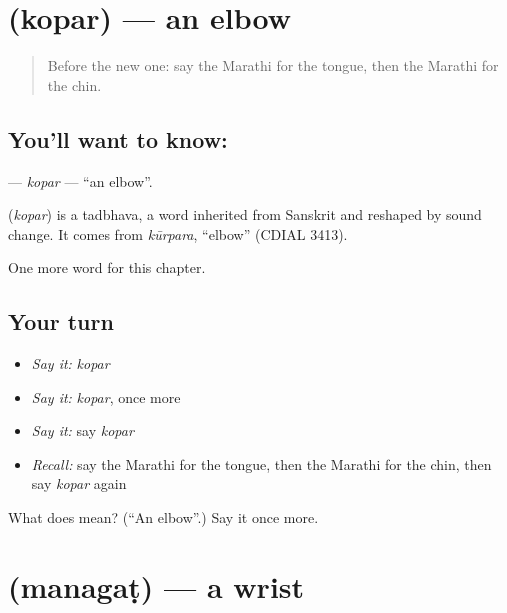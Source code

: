 \section[\texorpdfstring{\mr{कोपर} (kopar)}{कोपर (kopar)}]{ (kopar) — an elbow}

\label{lesson:MR-C145-kopar}



\begin{quote}
Before the new one: say the Marathi for the tongue, then the Marathi for the chin.
\end{quote}

\subsection*{You'll want to know: }
\textbf{} — \emph{kopar} — \textquotedblleft{}an elbow\textquotedblright{}.

\begin{cousinweb}
\textbf{} (\emph{kopar}) is a tadbhava, a word inherited from Sanskrit and reshaped by sound change. It comes from \emph{kūrpara}, \textquotedblleft{}elbow\textquotedblright{} (CDIAL 3413).
\end{cousinweb}

\begin{grammarlens}[title={What you've built}]
One more word for this chapter.
\end{grammarlens}

\subsection*{Your turn}
\begin{itemize}
\raggedright
  \item \emph{Say it:} \emph{kopar}
  \item \emph{Say it:} \emph{kopar}, once more
  \item \emph{Say it:} say \emph{kopar}
  \item \emph{Recall:} say the Marathi for the tongue, then the Marathi for the chin, then say \emph{kopar} again
\end{itemize}

\begin{tcolorbox}[breakable,colback=teal!4,colframe=teal!35!black,title={Before you move on}]
What does  mean? (\textquotedblleft{}An elbow\textquotedblright{}.) Say it once more.
\end{tcolorbox}
\section[\texorpdfstring{\mr{मनगट} (managaṭ)}{मनगट (managaṭ)}]{ (managaṭ) — a wrist}

